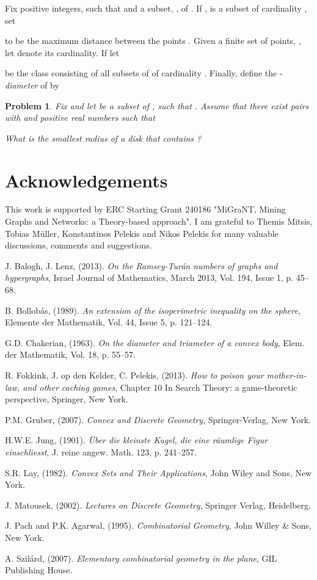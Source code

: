 \documentclass[12pt]{article}
\newtheorem{prbl}[thm]{Problem}
\begin{document}
Fix positive integers,  such that  and 
a subset, , of . If , is a subset of cardinality , set

to be the maximum distance between the points .
Given a finite set of points, , let  denote its cardinality. If  let 

be the class consisting of all subsets of  of cardinality .
Finally, define the -\emph{diameter} of  by 


\begin{prbl} Fix  and let  be a subset of , 
such that . Assume that 
there exist pairs  with 
and positive real numbers  such that 

What is the smallest radius of a disk that contains ?
\end{prbl}

\section*{Acknowledgements} 
This work is supported by ERC Starting 
Grant 240186 "MiGraNT, Mining Graphs and Networks: a Theory-based approach". I am grateful to 
Themis Mitsis, Tobias M\"uller, Konstantinos Pelekis and 
Nikos Pelekis for many valuable discussions, comments and suggestions.

\begin{thebibliography}{99}

 J. Balogh, J. Lenz, (2013). \textit{On the Ramsey-Tur\'an numbers of graphs and hypergraphs},
Israel Journal of Mathematics,
March 2013, Vol. 194, Issue 1, p. 45--68.

 B. Bollob\'as, (1989). \textit{An extension of the isoperimetric inequality on the sphere}, 
Elemente der Mathematik, Vol. 44, Issue 5, p. 121--124. 

 G.D. Chakerian, (1963). \textit{On the diameter and triameter of a convex body}, 
Elem. der Mathematik, Vol. 18, p. 55--57.



 R. Fokkink, J. op den Kelder, C. Pelekis, (2013). \textit{How to poison your 
mother-in-law, and other caching games}, Chapter 10 In Search Theory: a game-theoretic perspective, 
Springer, New York. 

 P.M. Gruber, (2007). \textit{Convex and Discrete Geometry}, Springer-Verlag, New York.

 H.W.E. Jung, (1901). \textit{\"Uber die kleinste Kugel, die eine r\"aumlige Figur einschliesst},
J. reine angew. 
Math. 123, p. 241--257.

 S.R. Lay, (1982). \textit{Convex Sets and Their Applications}, John Wiley and Sons, New York.

 J. Matousek, (2002). \textit{Lectures on Discrete Geometry}, Springer Verlag, Heidelberg.



 J. Pach and P.K. Agarwal, (1995). \textit{Combinatorial Geometry}, John Willey \& Sons, New York.

 A. Szil\'ard, (2007). \textit{Elementary combinatorial geometry in the plane}, GIL Publishing House.

\end{thebibliography}
\end{document}
